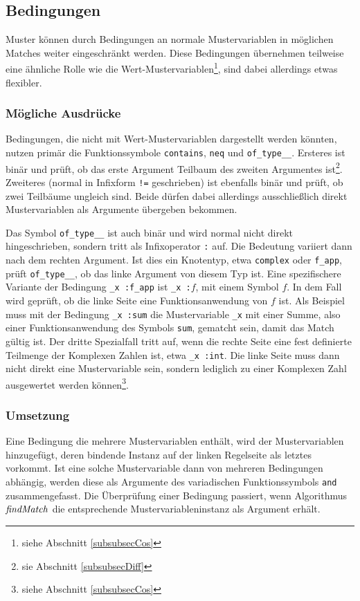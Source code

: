 \subsection{Bedingungen} \label{subsubsecBedingungen}

Muster können durch Bedingungen an normale Mustervariablen in möglichen Matches weiter eingeschränkt werden.
Diese Bedingungen übernehmen teilweise eine ähnliche Rolle wie die Wert-Mustervariablen\footnote{siehe Abschnitt \ref{subsubsecCos}}, sind dabei allerdings etwas flexibler. 


\subsubsection{Mögliche Ausdrücke}
Bedingungen, die nicht mit Wert-Mustervariablen dargestellt werden könnten, nutzen primär die Funktionssymbole \verb|contains|, \verb|neq| und \verb|of_type__|. Ersteres ist binär und prüft, ob das erste Argument Teilbaum des zweiten Argumentes ist\footnote{sie Abschnitt \ref{subsubsecDiff}}. Zweiteres (normal in Infixform \verb|!=| geschrieben) ist ebenfalls binär und prüft, ob zwei Teilbäume ungleich sind. Beide dürfen dabei allerdings ausschließlich direkt Mustervariablen als Argumente übergeben bekommen. 

Das Symbol \verb|of_type__| ist auch binär und wird normal nicht direkt hingeschrieben, sondern tritt als Infixoperator \verb|:| auf. Die Bedeutung variiert dann nach dem rechten Argument. Ist dies ein Knotentyp, etwa \verb|complex| oder \verb|f_app|, prüft \verb|of_type__|, ob das linke Argument von diesem Typ ist. Eine spezifischere Variante der Bedingung \verb|_x :f_app| ist {\verb|_x :|$f$}, mit einem Symbol $f$. In dem Fall wird geprüft, ob die linke Seite eine Funktionsanwendung von $f$ ist. Als Beispiel muss mit der Bedingung \verb|_x :sum| die Mustervariable \verb|_x| mit einer Summe, also einer Funktionsanwendung des Symbols \verb|sum|, gematcht sein, damit das Match gültig ist.
Der dritte Spezialfall tritt auf, wenn die rechte Seite eine fest definierte Teilmenge der Komplexen Zahlen ist, etwa \verb|_x :int|. Die linke Seite muss dann nicht direkt eine Mustervariable sein, sondern lediglich zu einer Komplexen Zahl ausgewertet werden können\footnote{siehe Abschnitt \ref{subsubsecCos}}.

\subsubsection{Umsetzung}
Eine Bedingung die mehrere Mustervariablen enthält, wird der Mustervariablen hinzugefügt, deren bindende Instanz auf der linken Regelseite als letztes vorkommt. Ist eine solche Mustervariable dann von mehreren Bedingungen abhängig, werden diese als Argumente des variadischen Funktionssymbols \verb|and| zusammengefasst. Die Überprüfung einer Bedingung passiert, wenn Algorithmus $\mathit{findMatch}$ die entsprechende Mustervariableninstanz als Argument erhält. 





